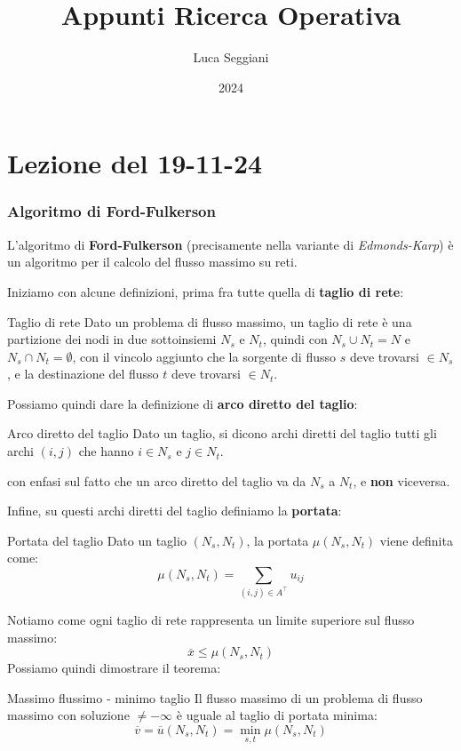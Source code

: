\documentclass[a4paper,11pt]{article}
\title{Appunti Ricerca Operativa}
\author{Luca Seggiani}
\date{2024}
\begin{document}
\section{Lezione del 19-11-24}

\thispagestyle{empty}
\pagestyle{fancy}

\subsubsection{Algoritmo di Ford-Fulkerson}
L'algoritmo di \textbf{Ford-Fulkerson} (precisamente nella variante di \textit{Edmonds-Karp}) è un algoritmo per il calcolo del flusso massimo su reti.

Iniziamo con alcune definizioni, prima fra tutte quella di \textbf{taglio di rete}:
\begin{definition}{Taglio di rete}
	Dato un problema di flusso massimo, un taglio di rete è una partizione dei nodi in due sottoinsiemi $N_s$ e $N_t$, quindi con $N_s \cup N_t = N$ e $N_s \cap N_t = \emptyset$, con il vincolo aggiunto che la sorgente di flusso $s$ deve trovarsi $\in N_s$, e la destinazione del flusso $t$ deve trovarsi $\in N_t$.
\end{definition}

Possiamo quindi dare la definizione di \textbf{arco diretto del taglio}:
\begin{definition}{Arco diretto del taglio}
	Dato un taglio, si dicono archi diretti del taglio tutti gli archi $(i,j)$ che hanno $i \in N_s$ e $j \in N_t$.
\end{definition}
con enfasi sul fatto che un arco diretto del taglio va da $N_s$ a $N_t$, e \textbf{non} viceversa.

Infine, su questi archi diretti del taglio definiamo la \textbf{portata}:
\begin{definition}{Portata del taglio}
	Dato un taglio $(N_s, N_t)$, la portata $\mu(N_s, N_t)$ viene definita come:
	$$
		\mu(N_s, N_t) = \sum_{(i,j) \in A^\intercal} u_{ij}
	$$
\end{definition}

Notiamo come ogni taglio di rete rappresenta un limite superiore sul flusso massimo:
	$$
		\overline{x} \leq \mu(N_s, N_t)
	$$
Possiamo quindi dimostrare il teorema:
\begin{theorem}{Massimo flussimo - minimo taglio}
	Il flusso massimo di un problema di flusso massimo con soluzione $\neq -\infty$ è uguale al taglio di portata minima:
	$$
		\overline{v} = \overline{u}(N_s, N_t) = \min_{s, t} \mu(N_s, N_t)
	$$
\end{theorem}
\end{document}
